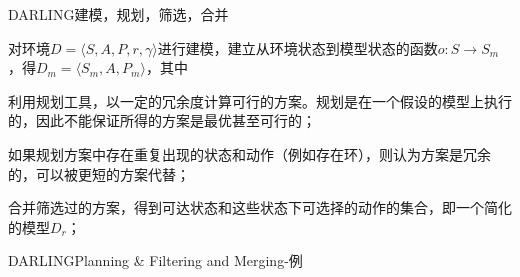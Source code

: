 \documentclass[10pt]{beamer}
\begin{document}
	\begin{frame}{DARLING}{建模，规划，筛选，合并}
		\begin{description}
			\item<2->[建模（Modeling）] 对环境$D=\langle S, A, P, r,\gamma \rangle$进行建模，建立从环境状态到模型状态的函数$o:S \rightarrow S_m$，得$D_m = \langle S_m, A, P_m \rangle$，其中
			\item<3->[规划（Planning）] 利用规划工具，以一定的冗余度计算可行的方案。规划是在一个假设的模型上执行的，因此不能保证所得的方案是最优甚至可行的；
			\item<4->[筛选（Filtering）] 如果规划方案中存在重复出现的状态和动作（例如存在环），则认为方案是冗余的，可以被更短的方案代替；
			\item<5->[合并（Merging）] 合并筛选过的方案，得到可达状态和这些状态下可选择的动作的集合，即一个简化的模型$D_r$；
		\end{description}
		
		\vspace{10pt}
	\end{frame}

	\begin{frame}{DARLING}{Planning \& Filtering and Merging-例}
		\begin{figure}
			\centering
			\label{fig:grid-world}
		\end{figure}
	
	\end{frame}
\end{document}
